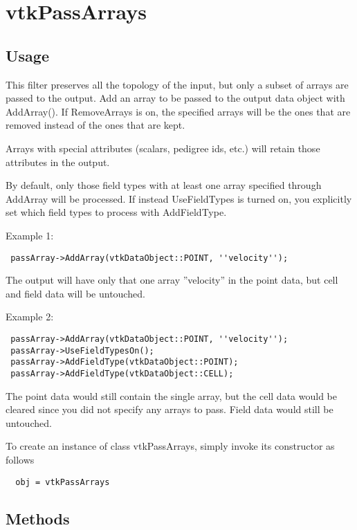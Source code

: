 \section{vtkPassArrays}

\subsection{Usage}

 This filter preserves all the topology of the input, but only a subset of
 arrays are passed to the output. Add an array to be passed to the output
 data object with AddArray(). If RemoveArrays is on, the specified arrays will
 be the ones that are removed instead of the ones that are kept.

 Arrays with special attributes (scalars, pedigree ids, etc.) will retain those
 attributes in the output.

 By default, only those field types with at least one array specified through
 AddArray will be processed. If instead UseFieldTypes
 is turned on, you explicitly set which field types to process with AddFieldType.

 Example 1:

 \begin{verbatim}
 passArray->AddArray(vtkDataObject::POINT, ''velocity'');
 \end{verbatim}

 The output will have only that one array ''velocity'' in the
 point data, but cell and field data will be untouched.

 Example 2:

 \begin{verbatim}
 passArray->AddArray(vtkDataObject::POINT, ''velocity'');
 passArray->UseFieldTypesOn();
 passArray->AddFieldType(vtkDataObject::POINT);
 passArray->AddFieldType(vtkDataObject::CELL);
 \end{verbatim}

 The point data would still contain the single array, but the cell data
 would be cleared since you did not specify any arrays to pass. Field data would
 still be untouched.

To create an instance of class vtkPassArrays, simply
invoke its constructor as follows
\begin{verbatim}
  obj = vtkPassArrays
\end{verbatim}
\subsection{Methods}

